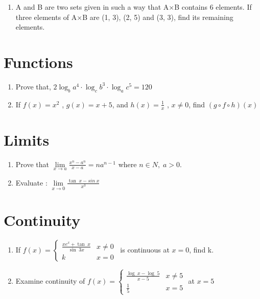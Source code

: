 \documentclass[14pt]{article}
\begin{document}
\begin{multicols}{2}
\begin{enumerate}
\item A and B are two sets given in such a way
that A$\times$B contains 6 elements. If three elements of
A$\times$B are (1, 3), (2, 5) and (3, 3), find its remaining
elements.

\end{enumerate} 

\section{Functions}
\noindent
\begin{enumerate}
\item Prove that, $2\log_ba^4 \cdot \log_cb^3 \cdot \log_ac^5 = 120$

\item If $f (x) = x^2$ , $g (x) = x + 5$, and $h(x) = \frac{1}{x}$ ,
	$x \neq 0$, find $(g \circ f \circ h) (x)$
\end{enumerate} 

\section{Limits}
\noindent
\begin{enumerate}

\item Prove that $ \lim\limits_{x \to a} \frac{x^n - a^n}{x - a}=na^{n-1}$ where $n \in N,\;a>0.$

\item Evaluate : $ \lim\limits_{x \to 0} \frac{\tan\;x - sin\;x}{x^3} $ 

\end{enumerate} 

\section{Continuity}
\noindent
\begin{enumerate}
\item If
$f(x) =  \begin{cases} 
       \frac{xe^x+\tan\;x}{\sin\;3x} & x\neq 0 \\
        k                            &  x = 0 
   \end{cases}$\, is continuous at $x=0$, find k.


\item Examine continuity of
$f(x) =  \begin{cases} 
       \frac{\log\;x - \log\;5}{x - 5} & x\neq 5 \\ 
        \frac{1}{5}                           &  x = 5
   \end{cases}$ at $ x  = 5$



\end{enumerate}
\end{multicols}
\end{document}

